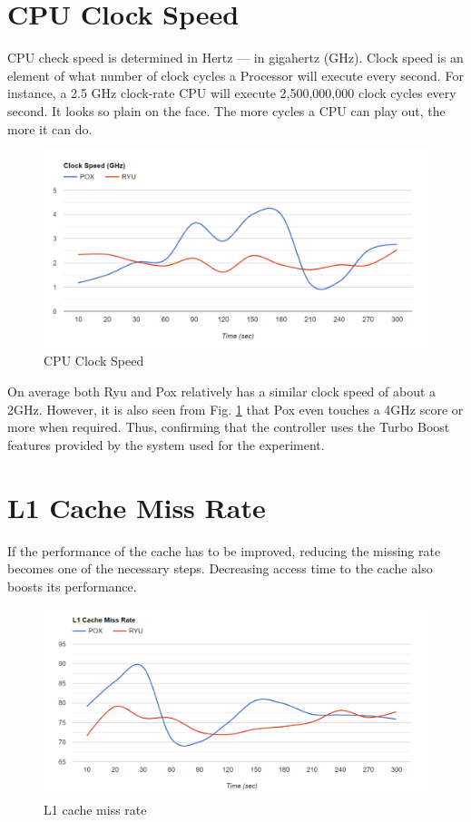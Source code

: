 \section{CPU Clock Speed}

CPU check speed is determined in Hertz — in gigahertz (GHz). Clock speed is an element of what number of clock cycles a Processor will execute every second. For instance, a 2.5 GHz clock-rate CPU will execute 2,500,000,000 clock cycles every second. It looks so plain on the face. The more cycles a CPU can play out, the more it can do.

\begin{figure}[!hbt]
    \centering
        \includegraphics[width=\textwidth,keepaspectratio]{images/clock_speed.png}
       \caption{CPU Clock Speed}
        \label{clockspeed}
\end{figure}

On average both Ryu and Pox relatively has a similar clock speed of about a 2GHz. However, it is also seen from Fig. \ref{clockspeed} that Pox even touches a 4GHz score or more when required. Thus, confirming that the controller uses the Turbo Boost features provided by the system used for the experiment.

\section{L1 Cache Miss Rate}

If the performance of the cache has to be improved, reducing the missing rate becomes one of the necessary steps. Decreasing access time to the cache also boosts its performance.

\begin{figure}[!hbt]
    \centering
        \includegraphics[width=\textwidth,keepaspectratio]{images/l1_miss_rate.png}
       \caption{L1 cache miss rate}
        \label{l1missrate}
\end{figure}

